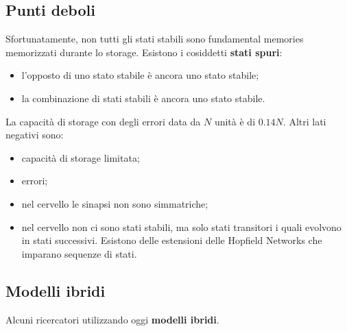 \subsection{Punti deboli}
Sfortunatamente, non tutti gli stati stabili sono fundamental memories memorizzati durante lo storage. Esistono i cosiddetti \textbf{stati spuri}:
\begin{itemize}
    \item l'opposto di uno stato stabile è ancora uno stato stabile;
    \item la combinazione di stati stabili è ancora uno stato stabile.
\end{itemize}
La capacità di storage con degli errori data da $N$ unità è di $0.14N$.
Altri lati negativi sono:
\begin{itemize}
    \item capacità di storage limitata;
    \item errori;
    \item nel cervello le sinapsi non sono simmatriche;
    \item nel cervello non ci sono stati stabili, ma solo stati transitori i quali evolvono in stati successivi. Esistono delle estensioni delle Hopfield Networks che imparano sequenze di stati.
\end{itemize}
\subsection{Modelli ibridi}
Alcuni ricercatori utilizzando oggi \textbf{modelli ibridi}.

